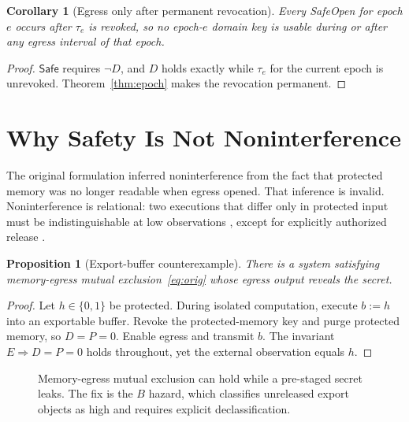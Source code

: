 \documentclass[11pt,letterpaper]{article}
\theoremstyle{plain}
\newtheorem{proposition}{Proposition}
\newtheorem{corollary}{Corollary}
\theoremstyle{definition}
\newcommand{\Safe}{\mathsf{Safe}}
\begin{document}
\begin{corollary}[Egress only after permanent revocation]\label{cor:egress}
Every SafeOpen for epoch $e$ occurs after $\tau_e$ is revoked, so no epoch-$e$ domain key is usable during or after any egress interval of that epoch.
\end{corollary}
\begin{proof}
$\Safe$ requires $\neg D$, and $D$ holds exactly while $\tau_{e}$ for the current epoch is unrevoked. Theorem~\ref{thm:epoch} makes the revocation permanent.
\end{proof}

\section{Why Safety Is Not Noninterference}\label{sec:ni}

The original formulation inferred noninterference from the fact that protected memory was no longer readable when egress opened. That inference is invalid. Noninterference is relational: two executions that differ only in protected input must be indistinguishable at low observations \cite{goguen1982,sabelfeld2003}, except for explicitly authorized release \cite{myers2006,arden2021}.

\begin{proposition}[Export-buffer counterexample]\label{prop:export}
There is a system satisfying memory-egress mutual exclusion~\eqref{eq:orig} whose egress output reveals the secret.
\end{proposition}
\begin{proof}
Let $h \in \{0,1\}$ be protected. During isolated computation, execute $b := h$ into an exportable buffer. Revoke the protected-memory key and purge protected memory, so $D = P = 0$. Enable egress and transmit $b$. The invariant $E \Rightarrow D = P = 0$ holds throughout, yet the external observation equals $h$.
\end{proof}

\begin{figure}[t]
\centering
{}
\caption{Memory-egress mutual exclusion can hold while a pre-staged secret leaks. The fix is the $B$ hazard, which classifies unreleased export objects as high and requires explicit declassification.}
\label{fig:export}
\end{figure}
\end{document}
